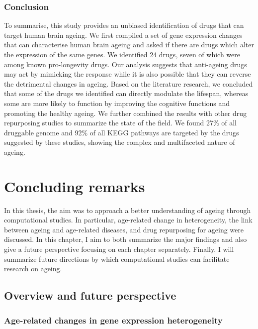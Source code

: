 \documentclass[12pt,twoside]{unicam}
\begin{document}
\hypertarget{conclusion-2}{%
\subsection{Conclusion}\label{conclusion-2}}

To summarise, this study provides an unbiased identification of drugs that can target human brain ageing. We first compiled a set of gene expression changes that can characterise human brain ageing and asked if there are drugs which alter the expression of the same genes. We identified 24 drugs, seven of which were among known pro-longevity drugs. Our analysis suggests that anti-ageing drugs may act by mimicking the response while it is also possible that they can reverse the detrimental changes in ageing. Based on the literature research, we concluded that some of the drugs we identified can directly modulate the lifespan, whereas some are more likely to function by improving the cognitive functions and promoting the healthy ageing. We further combined the results with other drug repurposing studies to summarize the state of the field. We found 27\% of all druggable genome and 92\% of all KEGG pathways are targeted by the drugs suggested by these studies, showing the complex and multifaceted nature of ageing.

\hypertarget{concludingRemarks}{%
\chapter{Concluding remarks}\label{concludingRemarks}}

In this thesis, the aim was to approach a better understanding of ageing through computational studies. In particular, age-related change in heterogeneity, the link between ageing and age-related diseases, and drug repurposing for ageing were discussed. In this chapter, I aim to both summarize the major findings and also give a future perspective focusing on each chapter separately. Finally, I will summarize future directions by which computational studies can facilitate research on ageing.

\hypertarget{overview-and-future-perspective}{%
\section{Overview and future perspective}\label{overview-and-future-perspective}}

\hypertarget{age-related-changes-in-gene-expression-heterogeneity}{%
\subsection{Age-related changes in gene expression heterogeneity}\label{age-related-changes-in-gene-expression-heterogeneity}}
\end{document}
